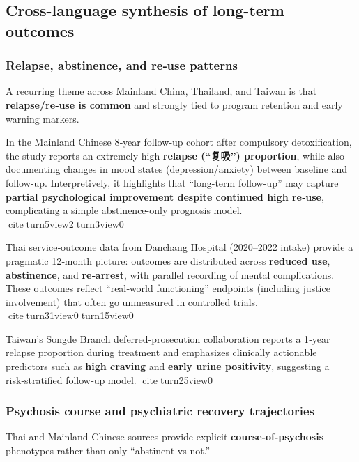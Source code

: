 \subsection{Cross-language synthesis of long-term outcomes}\label{13_non_english-cross-language-synthesis-of-long-term-outcomes}

\subsubsection{Relapse, abstinence, and re‑use patterns}\label{13_non_english-relapse-abstinence-and-reuse-patterns}

A recurring theme across Mainland China, Thailand, and Taiwan is that \textbf{relapse/re‑use is common} and strongly tied to program retention and early warning markers.

In the Mainland Chinese 8‑year follow‑up cohort after compulsory detoxification, the study reports an extremely high \textbf{relapse (``复吸'') proportion}, while also documenting changes in mood states (depression/anxiety) between baseline and follow‑up. Interpretively, it highlights that ``long-term follow-up'' may capture \textbf{partial psychological improvement despite continued high re‑use}, complicating a simple abstinence-only prognosis model. citeturn5view2turn3view0

Thai service‑outcome data from Danchang Hospital (2020--2022 intake) provide a pragmatic 12‑month picture: outcomes are distributed across \textbf{reduced use}, \textbf{abstinence}, and \textbf{re‑arrest}, with parallel recording of mental complications. These outcomes reflect ``real‑world functioning'' endpoints (including justice involvement) that often go unmeasured in controlled trials. citeturn31view0turn15view0

Taiwan's Songde Branch deferred‑prosecution collaboration reports a 1‑year relapse proportion during treatment and emphasizes clinically actionable predictors such as \textbf{high craving} and \textbf{early urine positivity}, suggesting a risk‑stratified follow‑up model. citeturn25view0

\subsubsection{Psychosis course and psychiatric recovery trajectories}\label{13_non_english-psychosis-course-and-psychiatric-recovery-trajectories}

Thai and Mainland Chinese sources provide explicit \textbf{course-of-psychosis} phenotypes rather than only ``abstinent vs not.''

